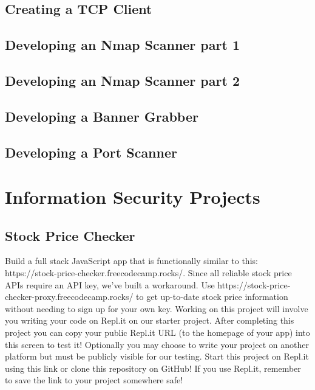 \documentclass{article}%
\begin{document}
%
\subsection{Creating a TCP Client}%
\label{subsec:CreatingaTCPClient}%

%
\subsection{Developing an Nmap Scanner part 1}%
\label{subsec:DevelopinganNmapScannerpart1}%

%
\subsection{Developing an Nmap Scanner part 2}%
\label{subsec:DevelopinganNmapScannerpart2}%

%
\subsection{Developing a Banner Grabber}%
\label{subsec:DevelopingaBannerGrabber}%

%
\subsection{Developing a Port Scanner}%
\label{subsec:DevelopingaPortScanner}%

%
\newpage%
\section{Information Security Projects}%
\label{sec:InformationSecurityProjects}%
\subsection{Stock Price Checker}%
\label{subsec:StockPriceChecker}%
Build a full stack JavaScript app that is functionally similar to this: https://stock{-}price{-}checker.freecodecamp.rocks/.\newline%
Since all reliable stock price APIs require an API key, we've built a workaround. Use https://stock{-}price{-}checker{-}proxy.freecodecamp.rocks/ to get up{-}to{-}date stock price information without needing to sign up for your own key.\newline%
Working on this project will involve you writing your code on Repl.it on our starter project. After completing this project you can copy your public Repl.it URL (to the homepage of your app) into this screen to test it! Optionally you may choose to write your project on another platform but must be publicly visible for our testing.\newline%
Start this project on Repl.it using this link or clone this repository on GitHub! If you use Repl.it, remember to save the link to your project somewhere safe!\newline%
\end{document}
